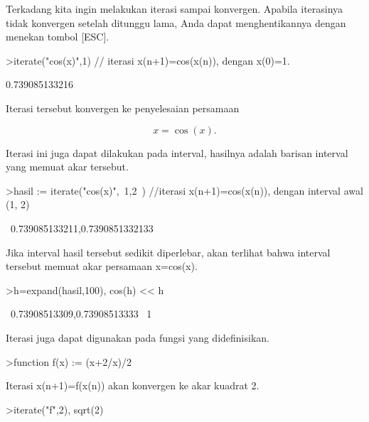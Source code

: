 \documentclass[a4paper,10pt]{article}
\begin{document}
\begin{eulernotebook}
\begin{eulercomment}
\begin{eulercomment}
\begin{eulercomment}
\begin{eulercomment}
\begin{eulercomment}
\begin{eulercomment}
\begin{eulercomment}
\begin{eulercomment}
\begin{eulercomment}
\begin{eulercomment}
\begin{eulercomment}
\begin{eulercomment}
\begin{eulercomment}
\begin{eulercomment}
\begin{eulercomment}
\begin{eulercomment}
\begin{eulercomment}
Terkadang kita ingin melakukan iterasi sampai konvergen. Apabila
iterasinya tidak konvergen setelah ditunggu lama, Anda dapat
menghentikannya dengan menekan tombol [ESC].
\end{eulercomment}
\begin{eulerprompt}
>iterate("cos(x)",1) // iterasi x(n+1)=cos(x(n)), dengan x(0)=1.
\end{eulerprompt}
\begin{euleroutput}
  0.739085133216
\end{euleroutput}
\begin{eulercomment}
Iterasi tersebut konvergen ke penyelesaian persamaan

\end{eulercomment}
\begin{eulerformula}
\[
x = \cos(x).
\]
\end{eulerformula}
\begin{eulercomment}
Iterasi ini juga dapat dilakukan pada interval, hasilnya adalah
barisan interval yang memuat akar tersebut.
\end{eulercomment}
\begin{eulerprompt}
>hasil := iterate("cos(x)",~1,2~) //iterasi x(n+1)=cos(x(n)), dengan interval awal (1, 2)
\end{eulerprompt}
\begin{euleroutput}
  ~0.739085133211,0.7390851332133~
\end{euleroutput}
\begin{eulercomment}
Jika interval hasil tersebut sedikit diperlebar, akan terlihat bahwa
interval tersebut memuat akar persamaan x=cos(x).
\end{eulercomment}
\begin{eulerprompt}
>h=expand(hasil,100), cos(h) << h
\end{eulerprompt}
\begin{euleroutput}
  ~0.73908513309,0.73908513333~
  1
\end{euleroutput}
\begin{eulercomment}
Iterasi juga dapat digunakan pada fungsi yang didefinisikan.
\end{eulercomment}
\begin{eulerprompt}
>function f(x) := (x+2/x)/2
\end{eulerprompt}
\begin{eulercomment}
Iterasi x(n+1)=f(x(n)) akan konvergen ke akar kuadrat 2.
\end{eulercomment}
\begin{eulerprompt}
>iterate("f",2), sqrt(2)

\end{eulerprompt}
\end{eulercomment}
\end{eulercomment}
\end{eulercomment}
\end{eulercomment}
\end{eulercomment}
\end{eulercomment}
\end{eulercomment}
\end{eulercomment}
\end{eulercomment}
\end{eulercomment}
\end{eulercomment}
\end{eulercomment}
\end{eulercomment}
\end{eulercomment}
\end{eulercomment}
\end{eulercomment}
\end{eulernotebook}
\end{document}
